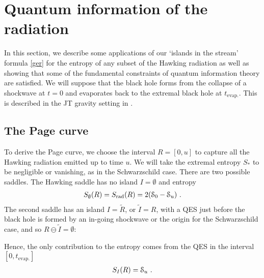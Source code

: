 \documentclass[12pt]{article}
\newcommand\ZZ{\EuScript S}
\newcommand{\EQ}[1]{\begin{equation}\begin{split} #1
\end{split}\end{equation}}
\begin{document}
\section{Quantum information of the radiation}\label{s4}

In this section, we describe some applications of our `islands in the stream' formula \eqref{ger} for the entropy of any subset of the Hawking radiation as well as showing  that some of the fundamental constraints of quantum information theory are satisfied. We will suppose that the black hole forms from the collapse of a shockwave at $t=0$ and evaporates back to the extremal black hole at $t_\text{evap.}$. This is described in the JT gravity setting in \cite{Hollowood:2020cou}.

\subsection{The Page curve}

To derive the Page curve, we choose the interval $R=[0,u]$ to capture all the Hawking radiation emitted up to time $u$. We will take the extremal entropy $S_*$ to be negligible or vanishing, as in the Schwarzschild case. There are two possible saddles. The Hawking saddle has no island $I=\emptyset$ and entropy
\EQ{
S_\emptyset(R)=S_\text{rad}(R)=2(\ZZ_0-\ZZ_u)\ .
}
The second saddle has an island $I=\tilde R$, or $\tilde I=R$, with a QES just before the black hole is formed by an in-going shockwave or the origin for the Schwarzschild case, and so $R\ominus\tilde I=\emptyset$:
\begin{center}
\end{center}
\noindent Hence, the only contribution to the entropy comes from the QES in the interval $[0,t_\text{evap.}]$
\EQ{
S_I(R)=\ZZ_u\ .
}
\end{document}
